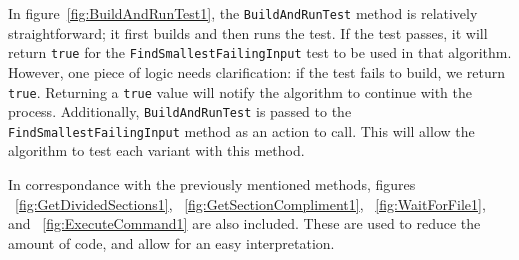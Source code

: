 In figure~\ref{fig:BuildAndRunTest1}, the \texttt{BuildAndRunTest} method is relatively straightforward; it first builds and then runs the test. If the test passes, it will return \texttt{true} for the \texttt{FindSmallestFailingInput} test to be used in that algorithm. However, one piece of logic needs clarification: if the test fails to build, we return \texttt{true}. Returning a \texttt{true} value will notify the algorithm to continue with the process. Additionally, \texttt{BuildAndRunTest} is passed to the \texttt{FindSmallestFailingInput} method as an action to call. This will allow the algorithm to test each variant with this method. 

In correspondance with the previously mentioned methods, figures ~\ref{fig:GetDividedSections1}, ~\ref{fig:GetSectionCompliment1}, ~\ref{fig:WaitForFile1}, and ~\ref{fig:ExecuteCommand1} are also included. These are used to reduce the amount of code, and allow for an easy interpretation.
